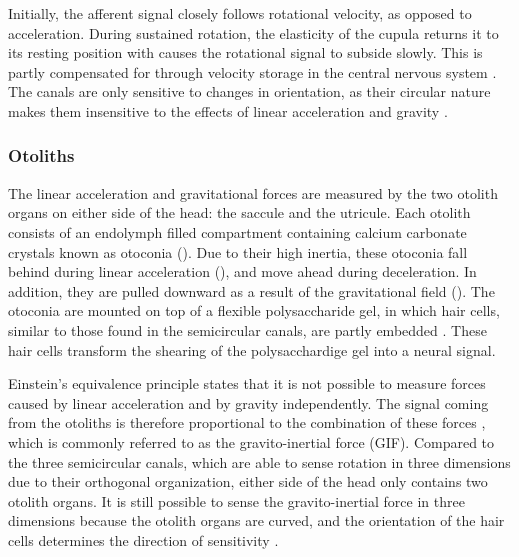 Initially, the afferent signal closely follows rotational velocity, as opposed to acceleration. During sustained rotation, the elasticity of the cupula returns it to its resting position with causes the rotational signal to subside slowly. This is partly compensated for through velocity storage in the central nervous system \cite{goldberg2012}. The canals are only sensitive to changes in orientation, as their circular nature makes them insensitive to the effects of linear acceleration and gravity \cite{goldberg2012}. 


\subsubsection{Otoliths}
The linear acceleration and gravitational forces are measured by the two otolith organs on either side of the head: the saccule and the utricule. Each otolith consists of an endolymph filled compartment containing calcium carbonate crystals known as otoconia (). Due to their high inertia, these otoconia fall behind during linear acceleration (), and move ahead during deceleration. In addition, they are pulled downward as a result of the gravitational field (). The otoconia are mounted on top of a flexible polysaccharide gel, in which hair cells, similar to those found in the semicircular canals, are partly embedded \cite{goldberg2012}. These hair cells transform the shearing of the polysacchardige gel into a neural signal.

Einstein's equivalence principle states that  it is not possible to measure forces caused by linear acceleration and by gravity independently. The signal coming from the otoliths is therefore proportional to the combination of these forces \cite{fernandez1976b}, which is commonly referred to as the gravito-inertial force (GIF). Compared to the three semicircular canals, which are able to sense rotation in three dimensions due to their orthogonal organization, either side of the head only contains two otolith organs. It is still possible to sense the gravito-inertial force in three dimensions because the otolith organs are curved, and the orientation of the hair cells determines the direction of sensitivity \cite{goldberg2012}.

